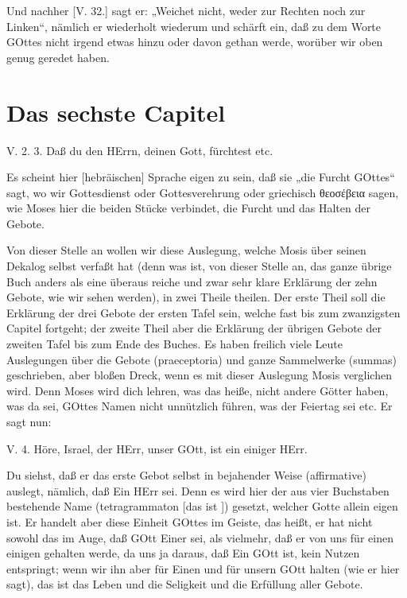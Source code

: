 Und nachher [V. 32.] sagt er: „Weichet nicht, weder zur Rechten noch zur Linken“, nämlich er wiederholt wiederum und schärft ein, daß zu dem Worte GOttes nicht irgend etwas hinzu oder davon gethan werde, worüber wir oben genug geredet haben.

\section{Das sechste Capitel}

\begin{schriftzitat}
V. 2. 3. Daß du den HErrn, deinen Gott, fürchtest etc.
\end{schriftzitat}

Es scheint hier [hebräischen] Sprache eigen zu sein, daß sie „die Furcht GOttes“ sagt, wo wir Gottesdienst oder Gottesverehrung oder griechisch θεοσέβεια sagen, wie Moses hier die beiden Stücke verbindet, die Furcht und das Halten der Gebote.

Von dieser Stelle an wollen wir diese Auslegung, welche Mosis über seinen Dekalog selbst verfaßt hat (denn was ist, von dieser Stelle an, das ganze übrige Buch anders als eine überaus reiche und zwar sehr klare Erklärung der zehn Gebote, wie wir sehen werden), in zwei Theile theilen. Der erste Theil soll die Erklärung der drei Gebote der ersten Tafel sein, welche fast bis zum zwanzigsten Capitel fortgeht; der zweite Theil aber die Erklärung der übrigen Gebote der zweiten Tafel bis zum Ende des Buches. Es haben freilich viele Leute Auslegungen über die Gebote (praeceptoria) und ganze Sammelwerke (summas) geschrieben, aber bloßen Dreck, wenn es mit dieser Auslegung Mosis verglichen wird. Denn Moses wird dich lehren, was das heiße, nicht andere Götter haben, was da sei, GOttes Namen nicht unnützlich führen, was der Feiertag sei etc. Er sagt nun:

\begin{schriftzitat}
V. 4. Höre, Israel, der HErr, unser GOtt, ist ein einiger HErr.
\end{schriftzitat}

Du siehst, daß er das erste Gebot selbst in bejahender Weise (affirmative) auslegt, nämlich, daß Ein HErr sei. Denn es wird hier der aus vier Buchstaben bestehende Name (tetragrammaton [das ist ]) gesetzt, welcher Gotte allein eigen ist. Er handelt aber diese Einheit GOttes im Geiste, das heißt, er hat nicht sowohl das im Auge, daß GOtt Einer sei, als vielmehr, daß er von uns für einen einigen gehalten werde, da uns ja daraus, daß Ein GOtt ist, kein Nutzen entspringt; wenn wir ihn aber für Einen und für unsern GOtt halten (wie er hier sagt), das ist das Leben und die Seligkeit und die Erfüllung aller Gebote.

